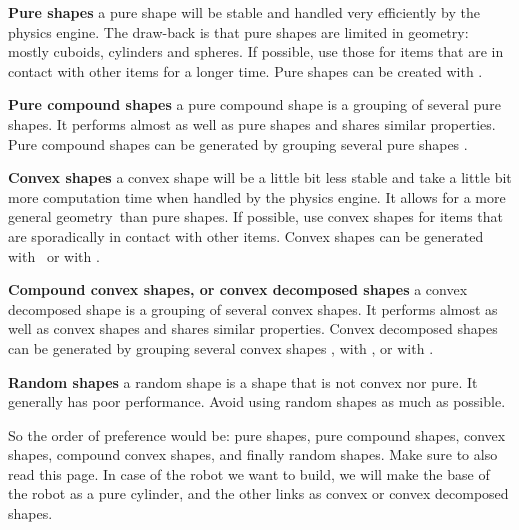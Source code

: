 \begin{description}
\item{\textbf{Pure shapes}}
a pure shape will be stable and handled very efficiently by the physics engine. 
The draw-back is that pure shapes are limited in geometry: mostly cuboids, 
cylinders and spheres. If possible, use those for items that are in contact
with other items for a longer time. Pure shapes 
can be created with .
\item{\textbf{Pure compound shapes}}
a pure compound shape is a grouping of several pure shapes. It performs almost 
as well as pure shapes and shares similar properties. Pure compound shapes can
be generated by grouping several pure shapes
.
\item{\textbf{Convex shapes}}
a convex shape will be a little bit less stable and take a little bit more 
computation time when handled by the physics engine. It allows for a more 
general geometry\ than pure shapes. 
If possible, use convex shapes for items that are sporadically in contact 
with other items. Convex shapes can be 
generated with \ or with
.
\item{\textbf{Compound convex shapes, or convex decomposed shapes}}
a convex decomposed shape is a grouping of several convex shapes. It performs 
almost as well as convex shapes and shares similar properties. Convex 
decomposed shapes can be generated by grouping several convex shapes
, with
, or with
.
\item{\textbf{Random shapes}}
a random shape is a shape that is not convex nor pure. It generally has poor 
performance. Avoid using random shapes 
as much as possible.
\end{description}

So the order of preference would be: pure shapes, pure compound shapes, 
convex shapes, compound convex shapes, and finally random shapes. Make sure 
to also read this page. In case of the robot we want to build, we will make 
the base of the robot as a pure cylinder, and the other links as convex or 
convex decomposed shapes.

